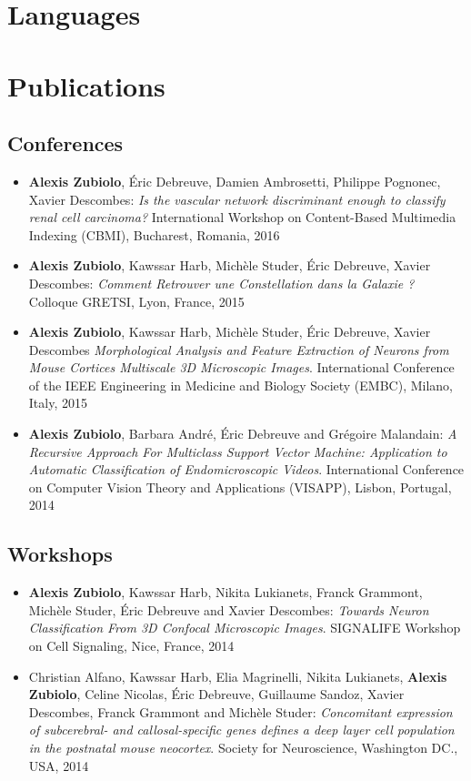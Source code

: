 \documentclass[11pt,a4paper,sans]{moderncv}   %
\begin{document}
\section{Languages}

\section{Publications}
\subsection{Conferences}
\begin{itemize}
\item \textbf{Alexis Zubiolo}, \'Eric Debreuve, Damien Ambrosetti, Philippe Pognonec, Xavier Descombes: \textit{Is the vascular network discriminant enough to classify renal cell carcinoma?}
International Workshop on Content-Based Multimedia Indexing (CBMI), Bucharest, Romania, 2016
\item \textbf{Alexis Zubiolo}, Kawssar Harb, Mich\`ele Studer, \'Eric Debreuve, Xavier Descombes: \textit{Comment Retrouver une Constellation dans la Galaxie ?}
Colloque GRETSI, Lyon, France, 2015
\item \textbf{Alexis Zubiolo}, Kawssar Harb, Mich\`ele Studer, \'Eric Debreuve, Xavier Descombes
\textit{Morphological Analysis and Feature Extraction of Neurons from Mouse Cortices Multiscale 3D Microscopic Images}.
International Conference of the IEEE Engineering in Medicine and Biology Society (EMBC), Milano, Italy, 2015
\item \textbf{Alexis Zubiolo}, Barbara André, \'Eric Debreuve and Grégoire Malandain:
\textit{A Recursive Approach For Multiclass Support Vector Machine: Application to Automatic Classification of Endomicroscopic Videos}. 
International Conference on Computer Vision Theory and Applications (VISAPP), Lisbon, Portugal, 2014

\end{itemize}

\subsection{Workshops}
\begin{itemize}

\item \textbf{Alexis Zubiolo}, Kawssar Harb, Nikita Lukianets, Franck Grammont, Michèle Studer, Éric Debreuve and Xavier Descombes: \textit{Towards Neuron Classification From 3D Confocal Microscopic Images}.
SIGNALIFE Workshop on Cell Signaling, Nice, France, 2014

\item Christian Alfano, Kawssar Harb, Elia Magrinelli, Nikita Lukianets, \textbf{Alexis Zubiolo}, Celine Nicolas, \'Eric Debreuve, Guillaume Sandoz, Xavier Descombes, Franck Grammont and Mich\`ele Studer: \textit{Concomitant expression of subcerebral- and callosal-specific genes defines a deep layer cell population in the postnatal mouse neocortex}.
Society for Neuroscience, Washington DC., USA, 2014
\end{itemize}
\end{document}
